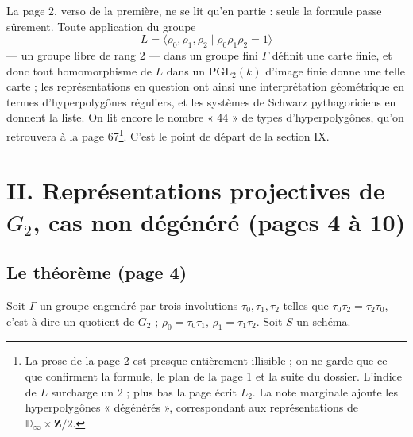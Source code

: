 \documentclass[11pt,a4paper]{article}
\begin{document}
La page 2, verso de la première, ne se lit qu'en partie : seule la formule
passe sûrement. Toute application du groupe
\[
  L = \langle \rho_0, \rho_1, \rho_2 \mid \rho_0\rho_1\rho_2 = 1\rangle
\]
--- un groupe libre de rang $2$ --- dans un groupe fini $\Gamma$ définit une
carte finie, et donc tout homomorphisme de $L$ dans un $\mathrm{PGL}_2(k)$
d'image finie donne une telle carte ; les représentations en question ont
ainsi une interprétation géométrique en termes d'hyperpolygônes réguliers, et
les systèmes de Schwarz pythagoriciens en donnent la liste. On lit encore le
nombre « 44 » de types d'hyperpolygônes, qu'on retrouvera à la
page 67\footnote{La prose de la page 2 est presque entièrement illisible ;
on ne garde que ce que confirment la formule, le plan de la page 1 et la
suite du dossier. L'indice de $L$ surcharge un $2$ ; plus bas la page écrit
$L_2$. La note marginale ajoute les hyperpolygônes « dégénérés »,
correspondant aux représentations de $\mathbb{D}_\infty \times
\mathbf{Z}/2$.}. C'est le point de départ de la section IX.

\section*{II. Représentations projectives de $G_2$, cas non dégénéré (pages 4 à 10)}

\subsection*{Le théorème (page 4)}

Soit $\Gamma$ un groupe engendré par trois involutions $\tau_0, \tau_1,
\tau_2$ telles que $\tau_0\tau_2 = \tau_2\tau_0$, c'est-à-dire un quotient de
$G_2$ ; $\rho_0 = \tau_0\tau_1$, $\rho_1 = \tau_1\tau_2$. Soit $S$ un schéma.
\end{document}
